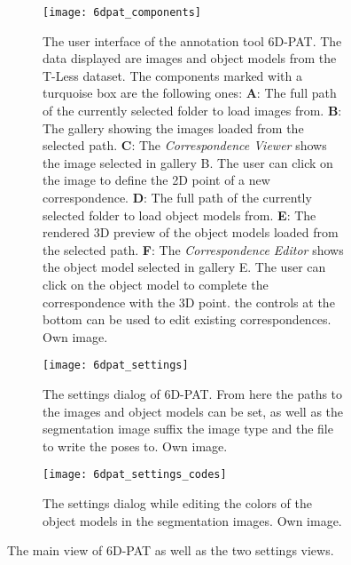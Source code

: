 \begin{figure}[!tbp]
	\centering
	\begin{subfigure}[t]{\textwidth}
		\centering
    	\texttt{[image: 6dpat\_components]}
    	\caption{The user interface of the annotation tool 6D-PAT. The data displayed are images and object models from the T-Less dataset. The components marked with a turquoise box are the following ones: \textbf{A}: The full path of the currently selected folder to load images from. \textbf{B}: The gallery showing the images loaded from the selected path. \textbf{C}: The \textit{Correspondence Viewer} shows the image selected in gallery B. The user can click on the image to define the 2D point of a new correspondence. \textbf{D}: The full path of the currently selected folder to load object models from. \textbf{E}: The rendered 3D preview of the object models loaded from the selected path. \textbf{F}: The \textit{Correspondence Editor} shows the object model selected in gallery E. The user can click on the object model to complete the correspondence with the 3D point. the controls at the bottom can be used to edit existing correspondences. Own image.}
    	\label{fig:6dpat_components}
	\end{subfigure}
	\par\bigskip
	\begin{subfigure}[t]{0.47\textwidth}
		\centering
    	\texttt{[image: 6dpat\_settings]}
    	\caption{The settings dialog of 6D-PAT. From here the paths to the images and object models can be set, as well as the segmentation image suffix the image type and the file to write the poses to. Own image.}
    	\label{fig:6dpat_settings}
	\end{subfigure}
	\hfill
	\begin{subfigure}[t]{0.47\textwidth}
	\centering
    	\texttt{[image: 6dpat\_settings\_codes]}
    	\caption{The settings dialog while editing the colors of the object models in the segmentation images. Own image.}
    	\label{fig:6dpat_settings_codes}
	\end{subfigure}
	\caption{The main view of 6D-PAT as well as the two settings views.}
	\label{fig:6dpat_ui_overview}
\end{figure}

